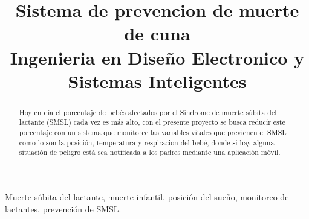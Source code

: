 \title{
    Sistema de prevencion de muerte de cuna\\
    \small{Ingenieria en Diseño Electronico y Sistemas Inteligentes}
}
\author{
    \and
    \and
}
\maketitle

%
%
\begin{abstract}

    Hoy en día el porcentaje de bebés afectados por el Síndrome de muerte súbita del lactante (SMSL) cada vez es más alto,
    con el presente proyecto se busca reducir este porcentaje con un sistema que monitoree las variables vitales que previenen el SMSL como lo son la posición, temperatura y respiracion del bebé,
    donde si hay alguna situación de peligro está sea notificada a los padres mediante una aplicación móvil.


\end{abstract}
\begin{IEEEkeywords}
    Muerte súbita del lactante, muerte infantil, posición del sueño, monitoreo de lactantes, prevención de SMSL.
\end{IEEEkeywords}

\tableofcontents
